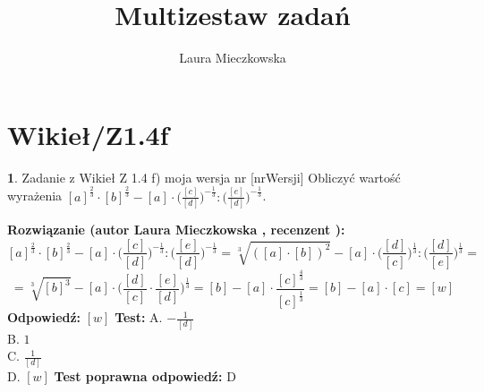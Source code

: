 \documentclass[12pt, a4paper]{article}
\title{Multizestaw zadań}
\author{Laura Mieczkowska}
\date{}
\theoremstyle{definition} %
\newtheorem{zad}{}
\newcommand{\kategoria}[1]{\section{#1}} %
\newcommand{\zadStart}[1]{\begin{zad}#1\newline} %
\newcommand{\zadStop}{\end{zad}}   %
\newcommand{\rozwStart}[2]{\noindent \textbf{Rozwiązanie (autor #1 , recenzent #2): }\newline} %
\newcommand{\odpStart}{\noindent \textbf{Odpowiedź:}\newline}    %
\newcommand{\odpStop}{\newline}                                             %
\newcommand{\testStart}{\noindent \textbf{Test:}\newline} %
\newcommand{\testStop}{\newline} %
\newcommand{\kluczStart}{\noindent \textbf{Test poprawna odpowiedź:}\newline} %
\newcommand{\kluczStop}{\newline} %
\begin{document}
\maketitle


\kategoria{Wikieł/Z1.4f}
\zadStart{Zadanie z Wikieł Z 1.4 f) moja wersja nr [nrWersji]}
Obliczyć wartość wyrażenia $[a]^{\frac{2}{3}}\cdot[b]^{\frac{2}{3}}-[a]\cdot\big(\frac{[c]}{[d]}\big)^{-\frac{1}{3}}:\big(\frac{[e]}{[d]}\big)^{-\frac{1}{3}}$.
\zadStop
\rozwStart{Laura Mieczkowska}{}
$$[a]^{\frac{2}{3}}\cdot[b]^{\frac{2}{3}}-[a]\cdot\bigg(\frac{[c]}{[d]}\bigg)^{-\frac{1}{3}}:\bigg(\frac{[e]}{[d]}\bigg)^{-\frac{1}{3}}=
\sqrt[3]{([a]\cdot[b])^2}-[a]\cdot\bigg(\frac{[d]}{[c]}\bigg)^{\frac{1}{3}}:\bigg(\frac{[d]}{[e]}\bigg)^{\frac{1}{3}}=$$
$$=\sqrt[3]{[b]^3}-[a]\cdot\bigg(\frac{[d]}{[c]}\cdot\frac{[e]}{[d]}\bigg)^{\frac{1}{3}}=
[b]-[a]\cdot\frac{[c]^{\frac{4}{3}}}{[c]^{\frac{1}{3}}}=[b]-[a]\cdot[c]=[w]$$
\odpStart
$[w]$
\odpStop
\testStart
A. $-\frac{1}{[d]}$ \\
B. $1$ \\
C. $\frac{1}{[d]}$ \\
D. $[w]$ 
\testStop
\kluczStart
D
\kluczStop
\end{document}
